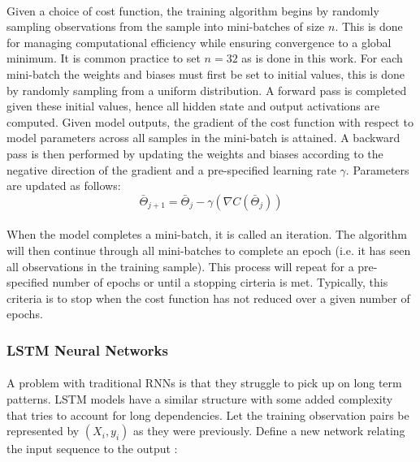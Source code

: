 \documentclass[11pt]{article}
\begin{document}
\begin{multicols*}{2}
                \vspace{-10pt}

                \paragraph{}
                    Given a choice of cost function, the training algorithm begins by randomly sampling observations from the sample into mini-batches of size $n$.
                    This is done for managing computational efficiency while ensuring convergence to a global minimum.  
                    It is common practice to set $n = 32$ as is done in this work.
                    For each mini-batch the weights and biases must first be set to initial values, this is done by randomly sampling from a uniform distribution.
                    A forward pass is completed given these initial values, hence all hidden state and output activations are computed.
                    Given model outputs, the gradient of the cost function with respect to model parameters across all samples in the mini-batch is attained. 
                    A backward pass is then performed by updating the weights and biases according to the negative direction of the gradient and a pre-specified learning rate $\gamma$. 
                    Parameters are updated as follows: $$\bar{\Theta}_{j+1} = \bar{\Theta}_j - \gamma (\nabla C(\bar{\Theta}_j))$$

                \paragraph{}
                    When the model completes a mini-batch, it is called an iteration. 
                    The algorithm will then continue through all mini-batches to complete an epoch (i.e. it has seen all observations in the training sample).
                    This process will repeat for a pre-specified number of epochs or until a stopping cirteria is met.
                    Typically, this criteria is to stop when the cost function has not reduced over a given number of epochs. 
                    

            \vspace{-5pt}

            \subsubsection*{LSTM Neural Networks}
                \paragraph{}
                    A problem with traditional RNNs is that they struggle to pick up on long term patterns.
                    LSTM models have a similar structure with some added complexity that tries to account for long dependencies. 
                    Let the training observation pairs be represented by $(X_i,y_i)$ as they were previously.
                    Define a new network relating the input sequence to the output \cite{Dupond19}:


\end{multicols*}
\end{document}

